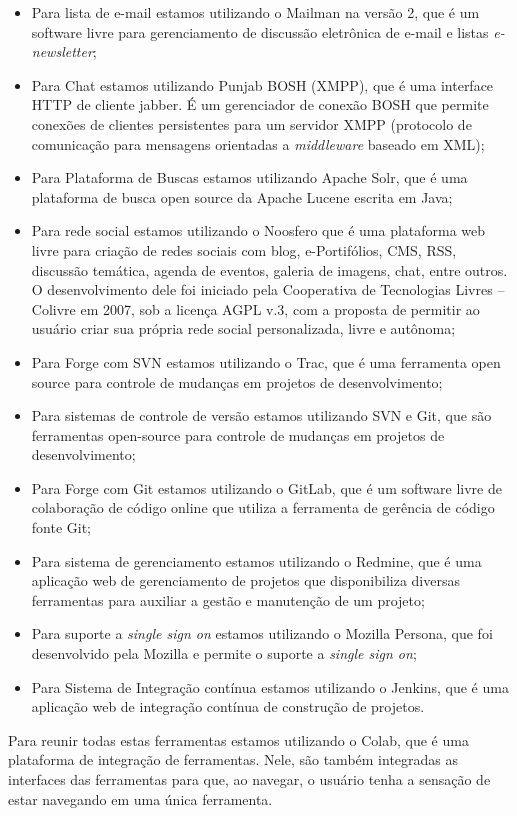 \begin{itemize}

\item Para lista de e-mail estamos utilizando o Mailman na versão 2, que é um software livre para gerenciamento de discussão eletrônica de e-mail e listas {\it e- newsletter};

\item Para Chat estamos utilizando Punjab BOSH (XMPP), que é uma interface HTTP de cliente jabber. É um gerenciador de conexão BOSH que permite conexões de clientes persistentes para um servidor XMPP (protocolo de comunicação para mensagens orientadas a {\it middleware} baseado em XML);

\item Para Plataforma de Buscas estamos utilizando Apache Solr, que é uma plataforma de busca open source da Apache Lucene escrita em Java;

\item Para rede social estamos utilizando o Noosfero que é uma plataforma web livre para criação de redes sociais com blog, e-Portifólios, CMS, RSS, discussão temática, agenda de eventos, galeria de imagens, chat, entre outros. O desenvolvimento dele foi iniciado pela Cooperativa de Tecnologias Livres – Colivre em 2007, sob a licença AGPL v.3, com a proposta de permitir ao usuário criar sua própria rede social personalizada, livre e autônoma;

\item Para Forge com SVN estamos utilizando o Trac, que é uma ferramenta open source para controle de mudanças em projetos de desenvolvimento;

\item Para sistemas de controle de versão estamos utilizando SVN e Git, que são ferramentas open-source para controle de mudanças em projetos de desenvolvimento;

\item Para Forge com Git estamos utilizando o GitLab, que é um software livre de colaboração de código online que utiliza a ferramenta de gerência de código fonte Git;

\item Para sistema de gerenciamento estamos utilizando o Redmine, que é uma aplicação web de gerenciamento de projetos que disponibiliza diversas ferramentas para auxiliar a gestão e manutenção de um projeto;

\item Para suporte a \textit{single sign on} estamos utilizando o Mozilla Persona, que foi desenvolvido pela Mozilla e permite o suporte a {\it single sign on};

\item Para Sistema de Integração contínua estamos utilizando o Jenkins, que é uma aplicação web de integração contínua de construção de projetos.
\end{itemize}


Para reunir todas estas ferramentas estamos utilizando o Colab, que é uma plataforma de integração de ferramentas. Nele, são também integradas as interfaces das ferramentas para que, ao navegar, o usuário tenha a sensação de estar navegando em uma única ferramenta.

